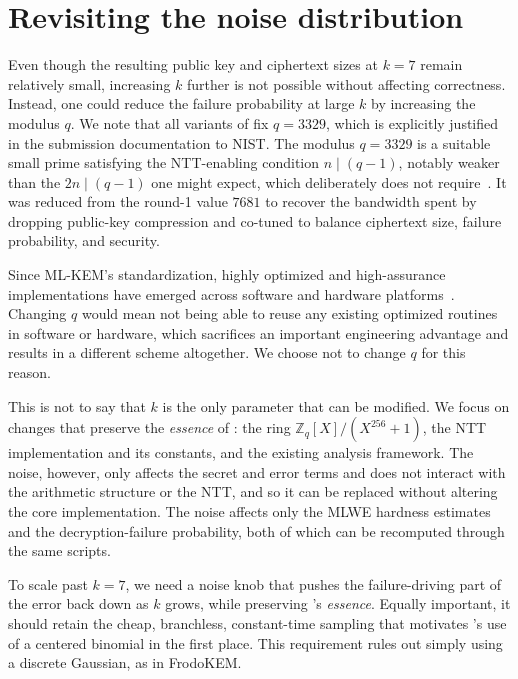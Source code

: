 \section{Revisiting the noise distribution}
\label{sec:distribution}
Even though the resulting public key and ciphertext sizes at $k=7$ remain relatively small, 
increasing $k$ further is not possible without affecting correctness. Instead, one could reduce the failure probability at large $k$ by increasing the modulus $q$.
We note that all variants of \kyber fix $q=3329$, which is explicitly justified in the submission documentation to NIST. The modulus
$q=3329$ is a suitable small prime satisfying the NTT-enabling condition $n \mid (q-1)$, notably weaker than the $2n \mid (q-1)$ one might expect, 
which \kyber deliberately does not require~\cite{kyberround2}. It was reduced from the round-1 value $7681$ to recover the
bandwidth spent by dropping public-key compression and co-tuned to balance ciphertext size, failure probability, and security. 

Since ML-KEM's standardization, highly optimized and high-assurance implementations have emerged across software and hardware platforms~\cite{mlkem-native,TCHES:ABBGLL23,SP:AOPPSS25}.
Changing $q$ would mean not being able to reuse any existing optimized routines in software or hardware, which sacrifices an important engineering advantage 
and results in a different scheme altogether. We choose not to change $q$ for this reason.

This is not to say that $k$ is the only parameter that can be modified. We focus on changes that preserve the \emph{essence} of \kyber:
the ring $\mathbb{Z}_q[X]/(X^{256}+1)$, the NTT implementation and its
constants, and the existing analysis framework. 
The noise, however, only affects the secret and error terms and does not interact with the arithmetic structure or the NTT, and so 
it can be replaced without altering the core implementation. The noise affects only the MLWE hardness estimates and the 
decryption-failure probability, both of which can be recomputed through the same scripts. 

To scale past $k=7$, we need a noise knob that pushes the failure-driving part of the error back down as $k$ grows, while preserving 
\kyber's \emph{essence}. Equally important, it should retain the cheap, branchless, constant-time sampling that motivates \kyber's use of a 
centered binomial in the first place. This requirement rules out simply using a discrete Gaussian, as in FrodoKEM.

